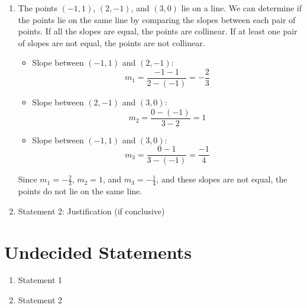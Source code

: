 \documentclass{article}
\begin{document}
\begin{enumerate}
    \item The points $(-1,1)$, $(2,-1)$, and $(3,0)$ lie on a line.\newline
          We can determine if the points lie on the same line by comparing the slopes between each pair of points.
          If all the slopes are equal, the points are collinear.
          If at least one pair of slopes are not equal, the points are not collinear.

          \begin{itemize}
              \item Slope between \((-1, 1)\) and \((2, -1)\):
                    \[
                        m_1 = \frac{-1 - 1}{2 - (-1)} = -\frac{2}{3}
                    \]

              \item Slope between \((2, -1)\) and \((3, 0)\):
                    \[
                        m_2 = \frac{0 - (-1)}{3 - 2} = 1
                    \]

              \item Slope between \((-1, 1)\) and \((3, 0)\):
                    \[
                        m_3 = \frac{0 - 1}{3 - (-1)} = \frac{-1}{4}
                    \]
          \end{itemize}

          Since \(m_1 = -\frac{2}{3}\), \(m_2 = 1\), and \(m_3 = -\frac{1}{4}\), and these slopes are not equal, the points do not lie on the same line.
    \item Statement 2: Justification (if conclusive)
\end{enumerate}

\section{Undecided Statements}

\begin{enumerate}
    \item Statement 1
    \item Statement 2
\end{enumerate}
\end{document}
